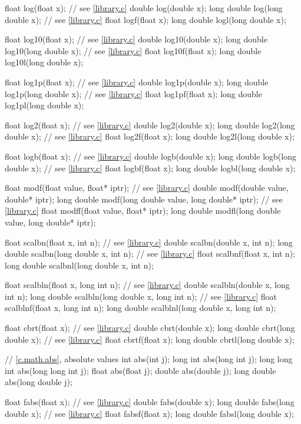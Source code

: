 \begin{codeblock}
{  float log(float x);  // see \ref{library.c}
  double log(double x);
  long double log(long double x);  // see \ref{library.c}
  float logf(float x);
  long double logl(long double x);

  float log10(float x);  // see \ref{library.c}
  double log10(double x);
  long double log10(long double x);  // see \ref{library.c}
  float log10f(float x);
  long double log10l(long double x);

  float log1p(float x);  // see \ref{library.c}
  double log1p(double x);
  long double log1p(long double x);  // see \ref{library.c}
  float log1pf(float x);
  long double log1pl(long double x);

  float log2(float x);  // see \ref{library.c}
  double log2(double x);
  long double log2(long double x);  // see \ref{library.c}
  float log2f(float x);
  long double log2l(long double x);

  float logb(float x);  // see \ref{library.c}
  double logb(double x);
  long double logb(long double x);  // see \ref{library.c}
  float logbf(float x);
  long double logbl(long double x);

  float modf(float value, float* iptr);  // see \ref{library.c}
  double modf(double value, double* iptr);
  long double modf(long double value, long double* iptr);  // see \ref{library.c}
  float modff(float value, float* iptr);
  long double modfl(long double value, long double* iptr);

  float scalbn(float x, int n);  // see \ref{library.c}
  double scalbn(double x, int n);
  long double scalbn(long double x, int n);  // see \ref{library.c}
  float scalbnf(float x, int n);
  long double scalbnl(long double x, int n);

  float scalbln(float x, long int n);  // see \ref{library.c}
  double scalbln(double x, long int n);
  long double scalbln(long double x, long int n);  // see \ref{library.c}
  float scalblnf(float x, long int n);
  long double scalblnl(long double x, long int n);

  float cbrt(float x);  // see \ref{library.c}
  double cbrt(double x);
  long double cbrt(long double x);  // see \ref{library.c}
  float cbrtf(float x);
  long double cbrtl(long double x);

  // \ref{c.math.abs}, absolute values
  int abs(int j);
  long int abs(long int j);
  long long int abs(long long int j);
  float abs(float j);
  double abs(double j);
  long double abs(long double j);

  float fabs(float x);  // see \ref{library.c}
  double fabs(double x);
  long double fabs(long double x);  // see \ref{library.c}
  float fabsf(float x);
  long double fabsl(long double x);

}
\end{codeblock}
